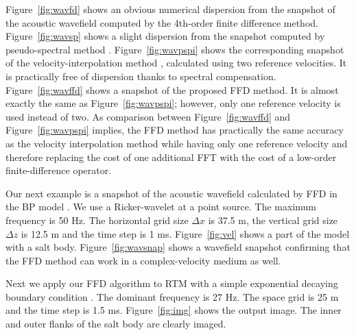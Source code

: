 Figure~\ref{fig:wavfd} shows an obvious numerical dispersion from the snapshot of the acoustic wavefield computed by the 4th-order finite difference method. 
Figure~\ref{fig:wavsp} shows a slight dispersion from the snapshot computed by pseudo-spectral method \cite[]{reshef}. 
Figure~\ref{fig:wavpspi} shows the corresponding snapshot of the velocity-interpolation method \cite[]{etgen,crawley}, calculated using two reference velocities. 
It is practically free of dispersion thanks to spectral compensation.
Figure~\ref{fig:wavffd} shows a snapshot of the proposed FFD method. 
It is almost exactly the same as Figure~\ref{fig:wavpspi}; 
however, only one reference velocity is used instead of two.
As comparison between Figure~\ref{fig:wavffd} and Figure~\ref{fig:wavpspi} implies, 
the FFD method has practically the same accuracy as the velocity interpolation method 
while having only one reference velocity and therefore  
replacing the cost of one additional FFT with the cost of a low-order finite-difference operator. 
\\




Our next example is a snapshot of the acoustic wavefield calculated by FFD in the BP model \cite[]{bp}. We use a Ricker-wavelet at a point source. The maximum frequency is 50 Hz. The horizontal grid size $\Delta x$ is 37.5 m, the vertical grid size $\Delta z$ is 12.5 m and the time step is 1 ms. 
Figure~\ref{fig:vel} shows a part of the model with a salt body.
Figure~\ref{fig:wavsnap} shows a wavefield snapshot confirming that the FFD method can work in a complex-velocity medium as well.\\



Next we apply our FFD algorithm to RTM with a simple exponential decaying boundary condition \cite[]{cerjan}. The dominant frequency is 27 Hz. The space grid is 25 m and the time step is 1.5 ms. Figure~\ref{fig:img} shows the output image. The inner and outer flanks of the salt body are clearly imaged.\\ 

